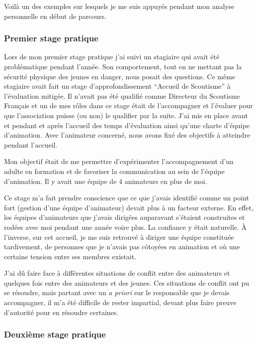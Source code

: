 \documentclass[titlepage,11pt,a4paper]{article}
\begin{document}
Voilà un des exemples sur lesquels je me suis appuyés pendant mon analyse personnelle en
début de parcours.

\subsubsection{Premier stage pratique}

Lors de mon premier stage pratique j'ai suivi un stagiaire qui avait été problématique pendant
l'année. Son comportement, tout en ne mettant pas la sécurité physique des jeunes en danger,
nous posait des questions. Ce même stagiaire avait fait un stage d'approfondissement
``Accueil de Scoutisme'' à l'évaluation mitigée. Il n'avait pas été qualifié comme Directeur du Scoutisme Français et
un de mes rôles dans ce stage était de l'accompagner et l'évaluer pour que l'association puisse (ou
non) le qualifier par la suite. J'ai mis en place avant et pendant et après l'accueil des
temps d'évaluation ainsi qu'une charte d'équipe d'animation. Avec l'animateur concerné,
nous avons fixé des objectifs à atteindre pendant l'accueil.

Mon objectif était de me permettre d'expérimenter l'accompagnement d'un
adulte en formation et de favoriser la communication au sein de l'équipe d'animation. Il y
avait une équipe de 4 animateurs en plus de moi.

Ce stage m'a fait prendre conscience que ce que j'avais identifié comme un point fort
(gestion d'une équipe d'animateur) devait plus à un facteur externe. En effet, les équipes
d'animateurs que j'avais dirigées auparavant s'étaient construites et rodées avec moi pendant
une année voire plus. La confiance y était naturelle. À l'inverse, sur cet accueil,
je me suis retrouvé à diriger une équipe constituée tardivement, de personnes que
je n'avais pas côtoyées en animation et où une certaine tension entre ses membres
existait.

J'ai dû faire face à différentes situations de conflit entre des
animateurs et quelques fois entre des animateurs et des jeunes. Ces situations de conflit
ont pu se résoudre, mais partant avec un \textit{a priori} sur le responsable que je
devais accompagner, il m'a été difficile de rester impartial, devant plus faire preuve
d'autorité pour en résoudre certaines.

\subsubsection{Deuxième stage pratique}
\end{document}
